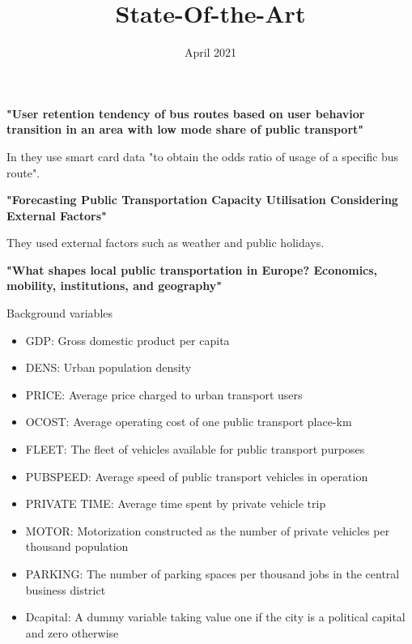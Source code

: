 \documentclass{article}
\title{State-Of-the-Art}
\date{April 2021}
\begin{document}
\maketitle

\textbf{"User retention tendency of bus routes based on user behavior transition in an area with low mode share of public transport"}

In \cite{user_retention_2020} they use smart card data "to obtain the odds ratio of usage of a specific bus route".

\textbf{"Forecasting Public Transportation Capacity Utilisation Considering External Factors"}

They used external factors such as weather and public holidays.


\textbf{"What shapes local public transportation in Europe? Economics, mobility, institutions, and geography"}

Background variables 
\begin{itemize}
\item GDP: Gross domestic product per capita
\item DENS: Urban population density
\item PRICE: Average price charged to urban transport users
\item OCOST: Average operating cost of one public transport place-km
\item FLEET: The fleet of vehicles available for public transport purposes
\item PUBSPEED: Average speed of public transport vehicles in operation
\item PRIVATE TIME: Average time spent by private vehicle trip
\item MOTOR: Motorization constructed as the number of private vehicles per thousand population
\item PARKING: The number of parking spaces per thousand jobs in the central business district
\item Dcapital: A dummy variable taking value one if the city is a political capital and zero otherwise
\end{itemize}


 
\end{document}

